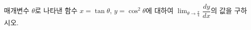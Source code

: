 매개변수 $\theta$로 나타낸 함수 $x=\tan\theta$, $y=\cos^2\theta$에 대하여 $\displaystyle\lim_{\theta\to\frac{\pi}{4}}\dfrac{dy}{dx}$의 값을 구하시오.
